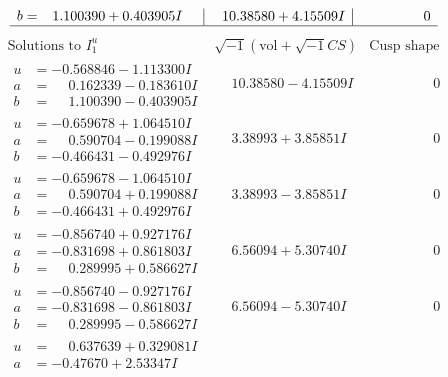 \documentclass[1p]{elsarticle_modified}
\theoremstyle{definition}
\newcommand{\I}{\sqrt{-1}}
\begin{document}
$$\begin{array}{c|c|c}
\begin{aligned}
b &= \phantom{-}1.100390 + 0.403905 I\end{aligned}
 & \phantom{-}10.38580 + 4.15509 I & \phantom{-0.000000 } 0\\
 \hline 
 \end{array}$$\newpage$$\begin{array}{c|c|c}  
\text{Solutions to }I^u_{1}& \I (\text{vol} + \sqrt{-1}CS) & \text{Cusp shape}\\
 \hline 
\begin{aligned}
u &= -0.568846 - 1.113300 I \\
a &= \phantom{-}0.162339 - 0.183610 I \\
b &= \phantom{-}1.100390 - 0.403905 I\end{aligned}
 & \phantom{-}10.38580 - 4.15509 I & \phantom{-0.000000 } 0 \\ \hline\begin{aligned}
u &= -0.659678 + 1.064510 I \\
a &= \phantom{-}0.590704 - 0.199088 I \\
b &= -0.466431 - 0.492976 I\end{aligned}
 & \phantom{-}3.38993 + 3.85851 I & \phantom{-0.000000 } 0 \\ \hline\begin{aligned}
u &= -0.659678 - 1.064510 I \\
a &= \phantom{-}0.590704 + 0.199088 I \\
b &= -0.466431 + 0.492976 I\end{aligned}
 & \phantom{-}3.38993 - 3.85851 I & \phantom{-0.000000 } 0 \\ \hline\begin{aligned}
u &= -0.856740 + 0.927176 I \\
a &= -0.831698 + 0.861803 I \\
b &= \phantom{-}0.289995 + 0.586627 I\end{aligned}
 & \phantom{-}6.56094 + 5.30740 I & \phantom{-0.000000 } 0 \\ \hline\begin{aligned}
u &= -0.856740 - 0.927176 I \\
a &= -0.831698 - 0.861803 I \\
b &= \phantom{-}0.289995 - 0.586627 I\end{aligned}
 & \phantom{-}6.56094 - 5.30740 I & \phantom{-0.000000 } 0 \\ \hline\begin{aligned}
u &= \phantom{-}0.637639 + 0.329081 I \\
a &= -0.47670 + 2.53347 I \\

\end{aligned}
\end{array}$$
\end{document}
